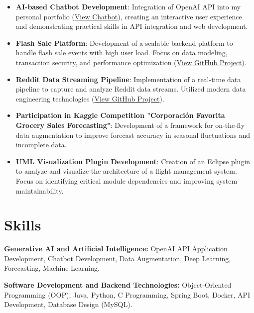 \documentclass[10pt, letterpaper]{article}
\begin{document}
\begin{itemize}[leftmargin=*]
\item \textbf{AI-based Chatbot Development}:  
Integration of OpenAI API into my personal portfolio (\href{https://personal-portfolio-mohamedayadidat.replit.app/chat}{View Chatbot}), creating an interactive user experience and demonstrating practical skills in API integration and web development.

\item \textbf{Flash Sale Platform}:  
Development of a scalable backend platform to handle flash sale events with high user load. Focus on data modeling, transaction security, and performance optimization (\href{https://github.com/Mayedi007/flash-sale-platform}{View GitHub Project}).

\item \textbf{Reddit Data Streaming Pipeline}:  
Implementation of a real-time data pipeline to capture and analyze Reddit data streams. Utilized modern data engineering technologies (\href{https://github.com/Mayedi007/reddit-data-streaming-pipeline}{View GitHub Project}).

\item \textbf{Participation in Kaggle Competition "Corporación Favorita Grocery Sales Forecasting"}:  
Development of a framework for on-the-fly data augmentation to improve forecast accuracy in seasonal fluctuations and incomplete data.

\item \textbf{UML Visualization Plugin Development}:  
Creation of an Eclipse plugin to analyze and visualize the architecture of a flight management system. Focus on identifying critical module dependencies and improving system maintainability.
\end{itemize}

\vspace{0.2 cm}

\section{Skills}

\textbf{Generative AI and Artificial Intelligence:}  
OpenAI API Application Development, Chatbot Development, Data Augmentation, Deep Learning, Forecasting, Machine Learning.

\textbf{Software Development and Backend Technologies:}  
Object-Oriented Programming (OOP), Java, Python, C Programming, Spring Boot, Docker, API Development, Database Design (MySQL).
\end{document}
